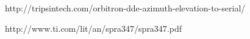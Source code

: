 \begin{thebibliography}{[1]}

http://tripsintech.com/orbitron-dde-azimuth-elevation-to-serial/

http://www.ti.com/lit/an/spra347/spra347.pdf
\end{thebibliography}
